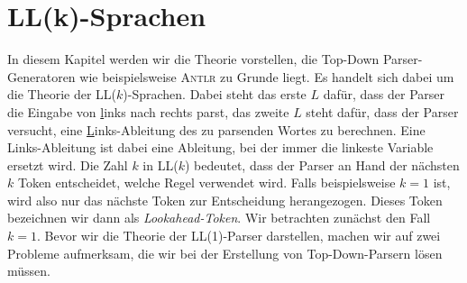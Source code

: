 \chapter{LL(k)-Sprachen}
In diesem Kapitel werden wir die Theorie vorstellen,  die 
Top-Down Parser-Generatoren wie beispielsweise \textsc{Antlr} zu Grunde liegt.  Es handelt
sich dabei um die Theorie der LL($k$)-Sprachen. 
Dabei steht das erste $L$ dafür, dass der Parser die Eingabe von \underline{l}inks nach rechts parst,
das zweite $L$ steht dafür, dass der Parser versucht, eine \underline{L}inks-Ableitung des
zu parsenden Wortes zu berechnen. Eine Links-Ableitung ist dabei eine Ableitung, bei der
immer die linkeste Variable ersetzt wird.
 Die Zahl $k$ in LL($k$) bedeutet, dass der Parser an Hand der nächsten $k$ Token
entscheidet, welche Regel verwendet wird.  Falls beispielsweise $k=1$ ist, wird also nur das nächste 
Token zur Entscheidung herangezogen.  Dieses Token bezeichnen wir dann als \emph{Lookahead-Token}.
Wir betrachten zunächst den Fall $k=1$. 
Bevor wir die Theorie der LL(1)-Parser darstellen, machen wir auf zwei Probleme
aufmerksam, die wir bei der Erstellung von Top-Down-Parsern lösen müssen.
